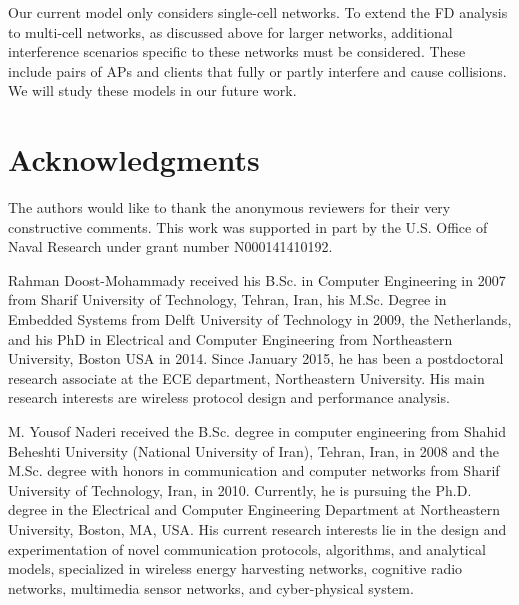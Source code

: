 \documentclass[10pt,journal,cspaper,compsoc]{IEEEtran}
\begin{document}
Our current model only considers single-cell networks. To extend the FD analysis to multi-cell networks, as discussed above for larger networks, additional interference scenarios specific to these networks must be considered. These include pairs of APs and clients that fully or partly interfere and cause collisions. We will study these models in our future work.






\section*{Acknowledgments}
The authors would like to thank the anonymous reviewers for their very constructive comments. This work was supported in part by the U.S. Office of Naval Research under grant number N000141410192.






\ifCLASSOPTIONcaptionsoff
  \newpage
\fi








\begin{IEEEbiography}{Rahman Doost-Mohammady}
	received his B.Sc. in Computer Engineering in 2007 from Sharif University of Technology, Tehran, Iran, his M.Sc. Degree in Embedded Systems from Delft University of Technology in 2009, the Netherlands, and his PhD in Electrical and Computer Engineering from Northeastern University, Boston USA in 2014. Since January 2015, he has been a postdoctoral research associate at the ECE department, Northeastern University. His main research interests are wireless protocol design and performance analysis.   
\end{IEEEbiography}

\begin{IEEEbiography}{M. Yousof Naderi}
	received the B.Sc. degree in computer engineering from Shahid Beheshti University (National University of Iran), Tehran, Iran, in 2008 and the M.Sc. degree with honors in communication and computer networks from Sharif University of Technology, Iran, in 2010. Currently, he is pursuing the Ph.D. degree in the Electrical and Computer Engineering Department at Northeastern University, Boston, MA, USA. His current research interests lie in the design and experimentation of novel communication protocols, algorithms, and analytical models, specialized in wireless energy harvesting networks, cognitive radio networks, multimedia sensor networks, and cyber-physical system.
\end{IEEEbiography}
\end{document}
